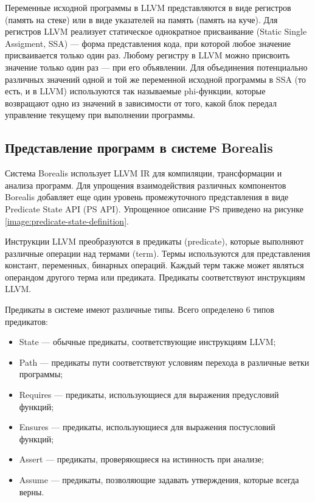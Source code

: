 Переменные исходной программы в LLVM представляются в виде регистров (память на стеке) или в виде указателей на память (память на куче). Для регистров LLVM реализует статическое однократное присваивание (Static Single Assigment, SSA) --- форма представления кода, при которой любое значение присваивается только один раз. Любому регистру в LLVM можно присвоить значение только один раз --- при его объявлении. Для объединения потенциально различных значений одной и той же переменной исходной программы в SSA (то есть, и в LLVM) используются так называемые phi-функции, которые возвращают одно из значений в зависимости от того, какой блок передал управление текущему при выполнении программы.

\subsection{Представление программ в системе Borealis}
Система Borealis использует LLVM IR для компиляции, трансформации и анализа программ. Для упрощения взаимодействия различных компонентов Borealis добавляет еще один уровень промежуточного представления в виде Predicate State API (PS API). Упрощенное описание PS приведено на рисунке \ref{image:predicate-state-definition}.
	
Инструкции LLVM преобразуются в предикаты (predicate), которые выполняют различные операции над термами (term). Термы используются для представления констант, переменных, бинарных операций. Каждый терм также может являться операндом другого терма или предиката. Предикаты соответствуют инструкциям LLVM.
	
Предикаты в системе имеют различные типы. Всего определено 6 типов предикатов:
\begin{itemize}
\item State --- обычные предикаты, соответствующие инструкциям LLVM;
\item Path --- предикаты пути соответствуют условиям перехода в различные ветки программы;
\item Requires --- предикаты, использующиеся для выражения предусловий функций;
\item Ensures --- предикаты, использующиеся для выражения постусловий функций;
\item Assert --- предикаты, проверяющиеся на истинность при анализе;
\item Assume --- предикаты, позволяющие задавать утверждения, которые всегда верны.
\end{itemize}

